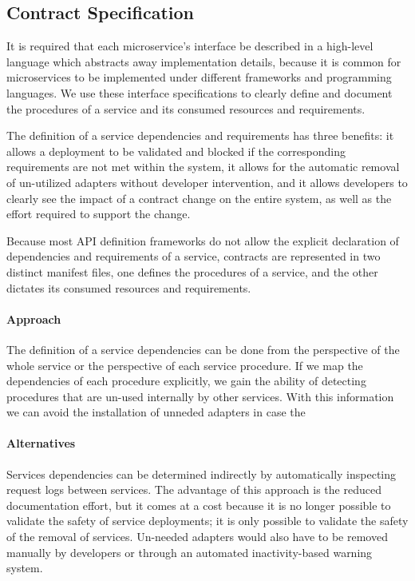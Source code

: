 \subsection{Contract Specification} %
\label{sec:contract_specification}

It is required that each microservice’s interface be
described in a high-level language which abstracts away implementation details, because it is common
for microservices to be implemented under different frameworks and programming languages.
We use these interface specifications to clearly define and document the procedures of a service and its consumed resources and requirements.

The definition of a service dependencies and requirements has three benefits: it allows a deployment to be validated and blocked if the corresponding requirements are not met within the system,
it allows for the automatic removal of un-utilized adapters without developer intervention,
and it allows developers to clearly see the impact of a contract change on the entire system, as well as the effort required to support the change.

Because most API definition frameworks do not allow the explicit declaration of dependencies and requirements of a service,
contracts are represented in two distinct manifest files, one defines the procedures of a service, and the other dictates its consumed resources and requirements.

\paragraph{Approach}
The definition of a service dependencies can be done from the perspective of the whole service or the perspective of each service procedure.
If we map the dependencies of each procedure explicitly, we gain the ability of detecting procedures that are un-used internally by other services.
With this information we can avoid the installation of unneded adapters in case the

\paragraph{Alternatives}
Services dependencies can be determined indirectly by automatically inspecting request logs between services.
The advantage of this approach is the reduced documentation effort, but it comes at a cost because
it is no longer possible to validate the safety of service deployments;
it is only possible to validate the safety of the removal of services.
Un-needed adapters would also have to be removed manually by developers or through an automated inactivity-based warning system.

